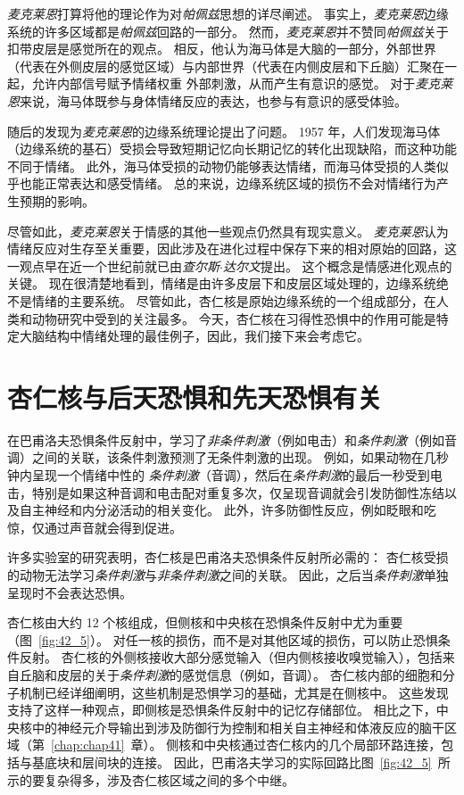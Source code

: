 \textit{麦克莱恩}打算将他的理论作为对\textit{帕佩兹}思想的详尽阐述。
事实上，\textit{麦克莱恩}边缘系统的许多区域都是\textit{帕佩兹}回路的一部分。
然而，\textit{麦克莱恩}并不赞同\textit{帕佩兹}关于扣带皮层是感觉所在的观点。
相反，他认为海马体是大脑的一部分，外部世界（代表在外侧皮层的感觉区域）与内部世界（代表在内侧皮层和下丘脑）汇聚在一起，允许内部信号赋予情绪权重 外部刺激，从而产生有意识的感觉。
对于\textit{麦克莱恩}来说，海马体既参与身体情绪反应的表达，也参与有意识的感受体验。


随后的发现为\textit{麦克莱恩}的边缘系统理论提出了问题。
1957 年，人们发现海马体（边缘系统的基石）受损会导致短期记忆向长期记忆的转化出现缺陷，而这种功能不同于情绪。
此外，海马体受损的动物仍能够表达情绪，而海马体受损的人类似乎也能正常表达和感受情绪。
总的来说，边缘系统区域的损伤不会对情绪行为产生预期的影响。


尽管如此，\textit{麦克莱恩}关于情感的其他一些观点仍然具有现实意义。
\textit{麦克莱恩}认为情绪反应对生存至关重要，因此涉及在进化过程中保存下来的相对原始的回路，这一观点早在近一个世纪前就已由\textit{查尔斯$\cdot$达尔文}提出。
这个概念是情感进化观点的关键。
现在很清楚地看到，情绪是由许多皮层下和皮层区域处理的，边缘系统绝不是情绪的主要系统。
尽管如此，杏仁核是原始边缘系统的一个组成部分，在人类和动物研究中受到的关注最多。
今天，杏仁核在习得性恐惧中的作用可能是特定大脑结构中情绪处理的最佳例子，因此，我们接下来会考虑它。



\section{杏仁核与后天恐惧和先天恐惧有关}

在巴甫洛夫恐惧条件反射中，学习了\textit{非条件刺激}（例如电击）和\textit{条件刺激}（例如音调）之间的关联，该条件刺激预测了无条件刺激的出现。
例如，如果动物在几秒钟内呈现一个情绪中性的 \textit{条件刺激}（音调），然后在\textit{条件刺激}的最后一秒受到电击，特别是如果这种音调和电击配对重复多次，仅呈现音调就会引发防御性冻结以及自主神经和内分泌活动的相关变化。
此外，许多防御性反应，例如眨眼和吃惊，仅通过声音就会得到促进。


许多实验室的研究表明，杏仁核是巴甫洛夫恐惧条件反射所必需的：
杏仁核受损的动物无法学习\textit{条件刺激}与\textit{非条件刺激}之间的关联。
因此，之后当\textit{条件刺激}单独呈现时不会表达恐惧。


杏仁核由大约 12 个核组成，但侧核和中央核在恐惧条件反射中尤为重要（图~\ref{fig:42_5}）。
对任一核的损伤，而不是对其他区域的损伤，可以防止恐惧条件反射。
杏仁核的外侧核接收大部分感觉输入（但内侧核接收嗅觉输入），包括来自丘脑和皮层的关于\textit{条件刺激}的感觉信息（例如，音调）。
杏仁核内部的细胞和分子机制已经详细阐明，这些机制是恐惧学习的基础，尤其是在侧核中。
这些发现支持了这样一种观点，即侧核是恐惧条件反射中的记忆存储部位。
相比之下，中央核中的神经元介导输出到涉及防御行为控制和相关自主神经和体液反应的脑干区域（第~\ref{chap:chap41}~章）。
侧核和中央核通过杏仁核内的几个局部环路连接，包括与基底块和层间块的连接。
因此，巴甫洛夫学习的实际回路比图~\ref{fig:42_5}~所示的要复杂得多，涉及杏仁核区域之间的多个中继。


